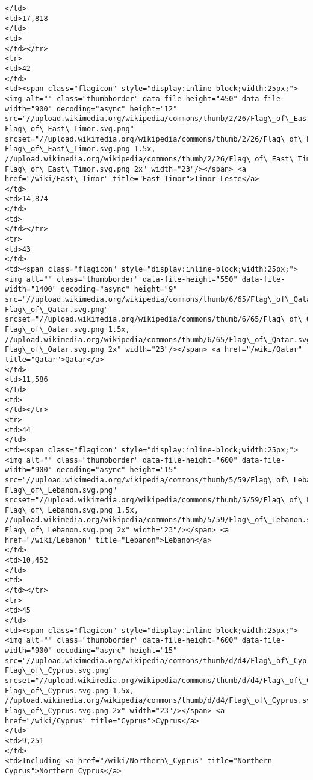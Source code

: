 \documentclass[11pt]{article}
\begin{document}
\begin{Verbatim}[commandchars=\\\{\}]
</td>
<td>17,818
</td>
<td>
</td></tr>
<tr>
<td>42
</td>
<td><span class="flagicon" style="display:inline-block;width:25px;"><img alt="" class="thumbborder" data-file-height="450" data-file-width="900" decoding="async" height="12" src="//upload.wikimedia.org/wikipedia/commons/thumb/2/26/Flag\_of\_East\_Timor.svg/23px-Flag\_of\_East\_Timor.svg.png" srcset="//upload.wikimedia.org/wikipedia/commons/thumb/2/26/Flag\_of\_East\_Timor.svg/35px-Flag\_of\_East\_Timor.svg.png 1.5x, //upload.wikimedia.org/wikipedia/commons/thumb/2/26/Flag\_of\_East\_Timor.svg/46px-Flag\_of\_East\_Timor.svg.png 2x" width="23"/></span> <a href="/wiki/East\_Timor" title="East Timor">Timor-Leste</a>
</td>
<td>14,874
</td>
<td>
</td></tr>
<tr>
<td>43
</td>
<td><span class="flagicon" style="display:inline-block;width:25px;"><img alt="" class="thumbborder" data-file-height="550" data-file-width="1400" decoding="async" height="9" src="//upload.wikimedia.org/wikipedia/commons/thumb/6/65/Flag\_of\_Qatar.svg/23px-Flag\_of\_Qatar.svg.png" srcset="//upload.wikimedia.org/wikipedia/commons/thumb/6/65/Flag\_of\_Qatar.svg/35px-Flag\_of\_Qatar.svg.png 1.5x, //upload.wikimedia.org/wikipedia/commons/thumb/6/65/Flag\_of\_Qatar.svg/46px-Flag\_of\_Qatar.svg.png 2x" width="23"/></span> <a href="/wiki/Qatar" title="Qatar">Qatar</a>
</td>
<td>11,586
</td>
<td>
</td></tr>
<tr>
<td>44
</td>
<td><span class="flagicon" style="display:inline-block;width:25px;"><img alt="" class="thumbborder" data-file-height="600" data-file-width="900" decoding="async" height="15" src="//upload.wikimedia.org/wikipedia/commons/thumb/5/59/Flag\_of\_Lebanon.svg/23px-Flag\_of\_Lebanon.svg.png" srcset="//upload.wikimedia.org/wikipedia/commons/thumb/5/59/Flag\_of\_Lebanon.svg/35px-Flag\_of\_Lebanon.svg.png 1.5x, //upload.wikimedia.org/wikipedia/commons/thumb/5/59/Flag\_of\_Lebanon.svg/45px-Flag\_of\_Lebanon.svg.png 2x" width="23"/></span> <a href="/wiki/Lebanon" title="Lebanon">Lebanon</a>
</td>
<td>10,452
</td>
<td>
</td></tr>
<tr>
<td>45
</td>
<td><span class="flagicon" style="display:inline-block;width:25px;"><img alt="" class="thumbborder" data-file-height="600" data-file-width="900" decoding="async" height="15" src="//upload.wikimedia.org/wikipedia/commons/thumb/d/d4/Flag\_of\_Cyprus.svg/23px-Flag\_of\_Cyprus.svg.png" srcset="//upload.wikimedia.org/wikipedia/commons/thumb/d/d4/Flag\_of\_Cyprus.svg/35px-Flag\_of\_Cyprus.svg.png 1.5x, //upload.wikimedia.org/wikipedia/commons/thumb/d/d4/Flag\_of\_Cyprus.svg/45px-Flag\_of\_Cyprus.svg.png 2x" width="23"/></span> <a href="/wiki/Cyprus" title="Cyprus">Cyprus</a>
</td>
<td>9,251
</td>
<td>Including <a href="/wiki/Northern\_Cyprus" title="Northern Cyprus">Northern Cyprus</a>

\end{Verbatim}
\end{document}
